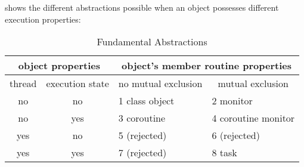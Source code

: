 \documentclass[openright,twoside]{report}
\begin{document}
 shows the different abstractions possible when an object possesses different execution properties:
\begin{table}[h]
\center
\begin{tabular}{c|c||l|l}
\multicolumn{2}{c||}{object properties}	& \multicolumn{2}{c}{object's member routine properties}					\\
\hline
thread	& execution state				& \multicolumn{1}{c|}{no mutual exclusion} & \multicolumn{1}{c}{mutual exclusion}\\
\hline
\hline
no		& no							& 1 class object						& 2 monitor							\\
\hline
no		& yes							& 3 coroutine							& 4 coroutine monitor				\\
\hline
yes		& no							& 5 (rejected)							& 6 (rejected)						\\
\hline
yes		& yes							& 7 (rejected)							& 8 task							\\
\end{tabular}

\caption{Fundamental Abstractions}
\label{t:FundamentalAbstractions}
\end{table}
\end{document}
